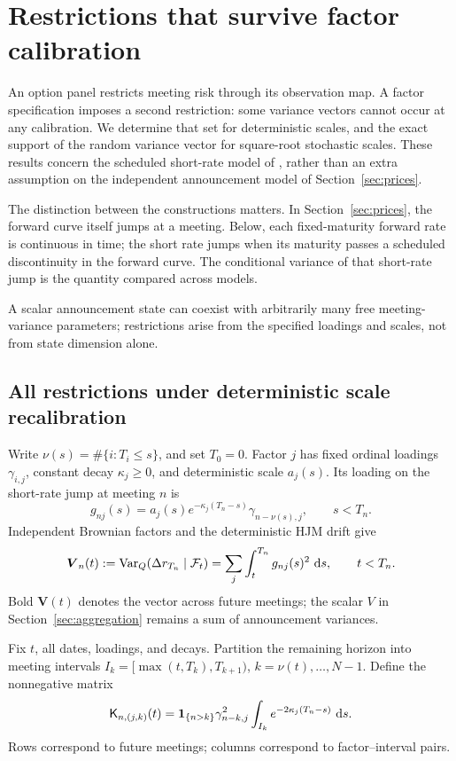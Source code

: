 \section{Restrictions that survive factor calibration}\label{sec:restrictions}
An option panel restricts meeting risk through its observation map. A factor specification imposes a second restriction: some variance vectors cannot occur at any calibration. We determine that set for deterministic scales, and the exact support of the random variance vector for square-root stochastic scales. These results concern the scheduled short-rate model of \citet{brace2024sofr}, rather than an extra assumption on the independent announcement model of Section~\ref{sec:prices}.

The distinction between the constructions matters. In Section~\ref{sec:prices}, the forward curve itself jumps at a meeting. Below, each fixed-maturity forward rate is continuous in time; the short rate jumps when its maturity passes a scheduled discontinuity in the forward curve. The conditional variance of that short-rate jump is the quantity compared across models.

A scalar announcement state can coexist with arbitrarily many free meeting-variance parameters; restrictions arise from the specified loadings and scales, not from state dimension alone.

\subsection{All restrictions under deterministic scale recalibration}
Write $\nu(s)=\#\{i:T_i\leq s\}$, and set $T_0=0$. Factor $j$ has fixed ordinal loadings $\gamma_{i,j}$, constant decay $\kappa_j\geq0$, and deterministic scale $a_j(s)$. Its loading on the short-rate jump at meeting $n$ is
\[
g_{nj}(s)=a_j(s)e^{-\kappa_j(T_n-s)}\gamma_{n-\nu(s),j},\qquad s<T_n.
\]
Independent Brownian factors and the deterministic HJM drift give
\begin{equation}\label{eq:detvariance}
\boldsymbol V_n(t):=\operatorname{Var}_Q(\Delta r_{T_n}\mid\mathcal F_t)
 =\sum_j\int_t^{T_n}g_{nj}(s)^2\,\,\mathrm d s,\qquad t<T_n.
\end{equation}
Bold $\boldsymbol V(t)$ denotes the vector across future meetings; the scalar $V$ in Section~\ref{sec:aggregation} remains a sum of announcement variances.

Fix $t$, all dates, loadings, and decays. Partition the remaining horizon into meeting intervals $I_k=[\max(t,T_k),T_{k+1})$, $k=\nu(t),\ldots,N-1$. Define the nonnegative matrix
\begin{equation}\label{eq:scale-matrix}
\mathsf K_{n,(j,k)}(t)=\mathbf 1_{\{n>k\}}\gamma_{n-k,j}^2
 \int_{I_k}e^{-2\kappa_j(T_n-s)}\,\,\mathrm d s.
\end{equation}
Rows correspond to future meetings; columns correspond to factor--interval pairs.

